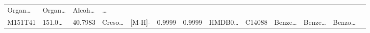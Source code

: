 \documentclass[
]{article}
\begin{document}
\begin{longtable}[]{@{}lllllllllllll@{}}
\begin{minipage}[t]{0.05\columnwidth}
Organ\ldots{}\strut
\end{minipage} & \begin{minipage}[t]{0.05\columnwidth}\raggedright
Organ\ldots{}\strut
\end{minipage} & \begin{minipage}[t]{0.05\columnwidth}\raggedright
Alcoh\ldots{}\strut
\end{minipage} & \begin{minipage}[t]{0.02\columnwidth}\raggedright
\ldots{}\strut
\end{minipage}\tabularnewline
\begin{minipage}[t]{0.05\columnwidth}\raggedright
M151T41\strut
\end{minipage} & \begin{minipage}[t]{0.05\columnwidth}\raggedright
151.0\ldots{}\strut
\end{minipage} & \begin{minipage}[t]{0.05\columnwidth}\raggedright
40.7983\strut
\end{minipage} & \begin{minipage}[t]{0.05\columnwidth}\raggedright
Creso\ldots{}\strut
\end{minipage} & \begin{minipage}[t]{0.05\columnwidth}\raggedright
{[}M-H{]}-\strut
\end{minipage} & \begin{minipage}[t]{0.07\columnwidth}\raggedright
0.9999\strut
\end{minipage} & \begin{minipage}[t]{0.07\columnwidth}\raggedright
0.9999\strut
\end{minipage} & \begin{minipage}[t]{0.05\columnwidth}\raggedright
HMDB0\ldots{}\strut
\end{minipage} & \begin{minipage}[t]{0.04\columnwidth}\raggedright
C14088\strut
\end{minipage} & \begin{minipage}[t]{0.05\columnwidth}\raggedright
Benze\ldots{}\strut
\end{minipage} & \begin{minipage}[t]{0.05\columnwidth}\raggedright
Benze\ldots{}\strut
\end{minipage} & \begin{minipage}[t]{0.05\columnwidth}\raggedright
Benzo\ldots{}\strut
\end{minipage} & \begin{minipage}[t]{0.02\columnwidth}\raggedright

\end{minipage}
\end{longtable}
\end{document}
